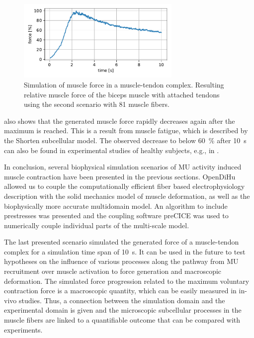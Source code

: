 \begin{figure}
  \centering%
  \includegraphics[width=0.7\textwidth]{images/results/application/precice_muscle_force.pdf}%
  \caption{Simulation of muscle force in a muscle-tendon complex. Resulting relative muscle force of the biceps muscle with attached tendons using the second scenario with 81 muscle fibers.}%
  \label{fig:precice_muscle_force0}%
\end{figure}

 also shows that the generated muscle force rapidly decreases again after the maximum is reached. This is a result from muscle fatigue, which is described by the Shorten subcellular model. The observed decrease to below \SI{60}{\percent} after \SI{10}{\s} can also be found in experimental studies of healthy subjects, e.g., in \cite{Enoka2008}. 

In conclusion, several biophysical simulation scenarios of MU activity induced muscle contraction have been presented in the previous sections. OpenDiHu allowed us to couple the computationally efficient fiber based electrophysiology description with the solid mechanics model of muscle deformation, as well as the biophysically more accurate multidomain model. An algorithm to include prestresses was presented and the coupling software preCICE was used to numerically couple individual parts of the multi-scale model. 

The last presented scenario simulated the generated force of a muscle-tendon complex for a simulation time span of \SI{10}{\s}. 
It can be used in the future to test hypotheses on the influence of various processes along the pathway from MU recruitment over muscle activation to force generation and macroscopic deformation. The simulated force progression related to the maximum voluntary contraction force is a macroscopic quantity, which can be easily measured in in-vivo studies. Thus, a connection between the simulation domain and the experimental domain is given and the microscopic subcellular processes in the muscle fibers are linked to a quantifiable outcome that can be compared with experiments.

